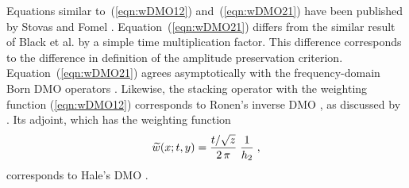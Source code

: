 Equations similar to~(\ref{eqn:wDMO12}) and~(\ref{eqn:wDMO21}) have been
published by Stovas and Fomel . Equation~(\ref{eqn:wDMO21})
differs from the similar result of Black et al.   by a simple
time multiplication factor. This difference corresponds to the difference in
definition of the amplitude preservation criterion. Equation~(\ref{eqn:wDMO21})
agrees asymptotically with the frequency-domain Born DMO operators
\cite[]{Born,GEO56-02-01820189,cwp}. Likewise, the stacking operator with the
weighting function (\ref{eqn:wDMO12}) corresponds to Ronen's inverse DMO
\cite[]{GEO52.07.09730984}, as discussed by \cite{Fomel.sepphd.107}.  Its
adjoint, which has the weighting function
\begin{equation}
\widetilde{w}(x;t,y)  =  {{t/\sqrt{z}} \over {2\,\pi}}\;{1 \over h_2}\;,
\label{eqn:hDMO21}
\end{equation}
corresponds to Hale's DMO \cite[]{GEO49.06.07410757}.

